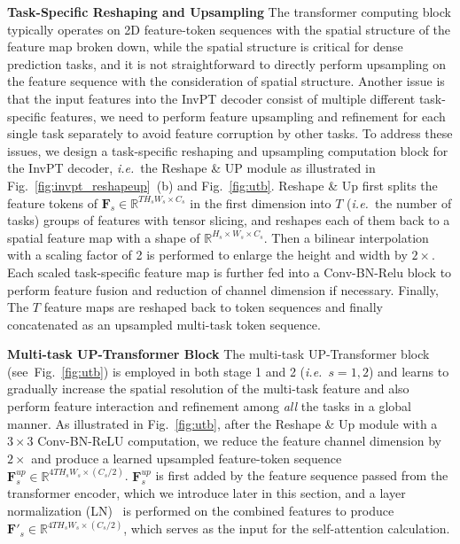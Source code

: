 \documentclass[runningheads]{llncs}
\newcommand*{\ie}{\emph{i.e.}}
\begin{document}
\vspace{3pt}
\par\noindent\textbf{Task-Specific Reshaping and Upsampling} The transformer computing block typically operates on 2D feature-token sequences with the spatial structure of the feature map broken down, while the spatial structure is critical for dense prediction tasks, and it is not straightforward to directly perform upsampling on the feature sequence with the consideration of spatial structure. Another issue is that the input features into the InvPT decoder consist of multiple different task-specific features, we need to perform feature upsampling and refinement for each single task separately to avoid feature corruption by other tasks. To address these issues, we design a task-specific reshaping and upsampling computation block for the InvPT decoder, \ie~the Reshape \& UP module as illustrated in Fig.~\ref{fig:invpt_reshapeup}~(b) and Fig.~\ref{fig:utb}. {Reshape \& Up} first splits the feature tokens of $\mathbf{F}_s \in \mathbb{R}^{TH_s W_s  \times C_s }$ in the first dimension into $T$ (\ie~the number of tasks) groups of features with tensor slicing, and reshapes each of them back to a spatial feature map with a shape of $\mathbb{R}^{H_s\times W_s\times C_s}$. Then a bilinear interpolation with a scaling factor of 2 is performed to enlarge the height and width by $2\times$. Each scaled task-specific feature map is further fed into a Conv-BN-Relu block to perform feature fusion and reduction of channel dimension if necessary. Finally, The $T$ feature maps are reshaped back to token sequences and finally concatenated as an upsampled multi-task token sequence.
\vspace{3pt}
\par\noindent\textbf{Multi-task UP-Transformer Block} The multi-task UP-Transformer block (see~Fig.~\ref{fig:utb}) is employed in both stage 1 and 2 (\ie~$s=1,2$) and learns to gradually increase the spatial resolution of the multi-task feature and also perform feature interaction and refinement among \emph{all} the tasks in a global manner. As illustrated in Fig.~\ref{fig:utb},
after the Reshape \& Up module with a $3\times 3$ Conv-BN-ReLU computation, we reduce the feature channel dimension by $2\times$ and produce a
learned upsampled feature-token sequence $\mathbf{F}^{up}_s \in \mathbb{R}^{4TH_s W_s \times (C_s/2)}$. $\mathbf{F}_s^{up}$ is first added by the feature sequence passed from the transformer encoder, which we introduce later in this section, and a layer normalization (LN)~\cite{layernorm} is performed on the combined features to produce $\mathbf{F}'_s \in
\mathbb{R}^{4TH_s W_s \times (C_s/2)}$, which serves as the input for the self-attention calculation.
\end{document}
